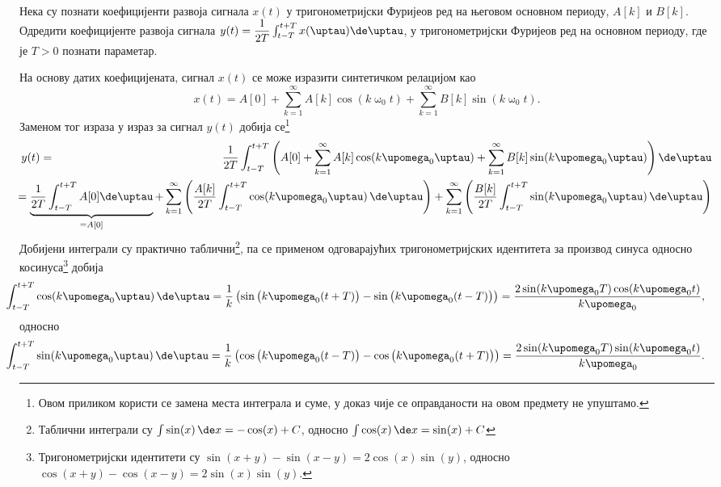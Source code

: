 \noindent 
\PID \label{z:fr_moving_average} 
Нека су познати коефицијенти развоја сигнала $x(t)$ у тригонометријски Фуријеов ред на његовом основном периоду, 
$A[k]$ и $B[k]$. Одредити коефицијенте развоја сигнала 
$y(t) = \dfrac{1}{2T}\int_{t-T}^{t+T} x(\uptau) \de \uptau$, у тригонометријски Фуријеов ред на основном периоду, 
где је $T>0$ познати параметар.

\RESENJE
На основу датих коефицијената, сигнал $x(t)$ се може изразити синтетичком релацијом као 
\begin{equation}
    x(t) = A[0] + \sum_{k=1}^{\infty} A[k] \cos(k\upomega_0 t) + \sum_{k=1}^{\infty} B[k] \sin(k\upomega_0 t).
\end{equation}
Заменом тог израза у израз за сигнал $y(t)$ добија се\footnote{Овом 
приликом користи се замена места интеграла и суме, у доказ чије се оправданости на овом предмету не упуштамо.} 
\begin{eqnarray}
    y(t) &=& \dfrac{1}{2T} \int_{t-T}^{t+T}
    \left(
        A[0] + \sum_{k=1}^{\infty} A[k] \cos(k\upomega_0 \uptau) + \sum_{k=1}^{\infty} B[k] \sin(k\upomega_0 \uptau) 
    \right) \de \uptau \\
    && \hspace*{-4em} = 
    \underbrace{\dfrac{1}{2T} \int_{t-T}^{t+T} A[0] \de \uptau}_{=A[0]} + 
    \sum_{k = 1}^{\infty} \left( \dfrac{A[k]}{2T} \int_{t-T}^{t+T} \cos(k\upomega_0 \uptau)\,\de\uptau \right) + 
    \sum_{k = 1}^{\infty} \left( \dfrac{B[k]}{2T} \int_{t-T}^{t+T} \sin(k\upomega_0 \uptau)\,\de\uptau\right) \label{\ID.1}
\end{eqnarray}
Добијени интеграли су практично таблични\footnote{
    Таблични интеграли су $\int \sin(x)\,\de x = -\cos(x) + C$, односно
    $\int \cos(x)\,\de x = \sin(x) + C$
}, па се применом одговарајућих тригонометријских идентитета за производ синуса односно косинуса\footnote{
    Тригонометријски идентитети су
    $\sin(x+y) - \sin(x-y) = 2\cos(x)\sin(y)$, односно 
    $\cos(x+y) - \cos(x-y) = 2\sin(x)\sin(y)$. 
} добија
\begin{eqnarray}
    \hspace*{-2em}
    \int_{t-T}^{t+T} \cos(k\upomega_0 \uptau)\,\de\uptau = 
    \dfrac{1}{k}\left(
        \sin\big(k\upomega_0(t+T)\big)-\sin\big(k\upomega_0(t-T)\big)
    \right) = \dfrac{2\sin(k\upomega_0 T)\cos(k\upomega_0 t)}{k\upomega_0}, \label{\ID.2}
\end{eqnarray}
односно
\begin{eqnarray}
    \hspace*{-2em}
    \int_{t-T}^{t+T} \sin(k\upomega_0 \uptau)\,\de\uptau = 
    \dfrac{1}{k}\left(
        \cos\big(k\upomega_0(t-T)\big)-\cos\big(k\upomega_0(t+T)\big)
    \right) = \dfrac{2\sin(k\upomega_0 T)\sin(k\upomega_0 t)}{k\upomega_0}. \label{\ID.3}
\end{eqnarray}
